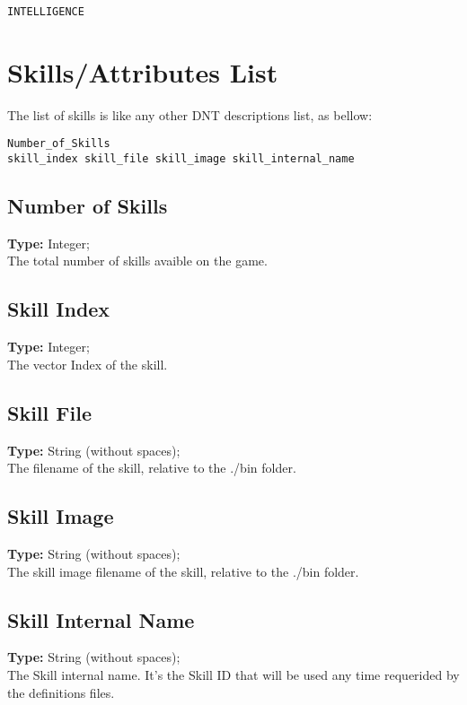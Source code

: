 \documentclass[letterpaper,12pt]{article}
\begin{document}
\begin{verbatim}
INTELLIGENCE
\end{verbatim}

\section{Skills/Attributes List}

The list of skills is like any other DNT descriptions list, as bellow:

\begin{verbatim}
Number_of_Skills
skill_index skill_file skill_image skill_internal_name
\end{verbatim}

\subsection{Number of Skills}
{\bf Type:} Integer;\\
The total number of skills avaible on the game.

\subsection{Skill Index}
{\bf Type:} Integer;\\
The vector Index of the skill.

\subsection{Skill File}
{\bf Type:} String (without spaces);\\
The filename of the skill, relative to the ./bin folder.

\subsection{Skill Image}
{\bf Type:} String (without spaces);\\
The skill image filename of the skill, relative to the ./bin folder.

\subsection{Skill Internal Name}
{\bf Type:} String (without spaces);\\
The Skill internal name. It's the Skill ID that will be used any time requerided
by the definitions files.
\end{document}
